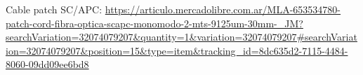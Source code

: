 \begin{thebibliography}{99}
 Cable patch SC/APC: \url{https://articulo.mercadolibre.com.ar/MLA-653534780-patch-cord-fibra-optica-scapc-monomodo-2-mts-9125um-30mm-_JM?searchVariation=32074079207&quantity=1&variation=32074079207#searchVariation=32074079207&position=15&type=item&tracking_id=8dc635d2-7115-4484-8060-09dd09ee6bd8}



\end{thebibliography}




\newpage
